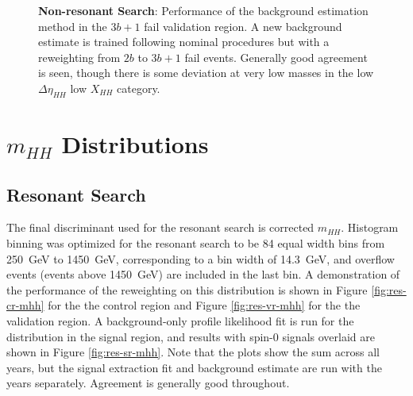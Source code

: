 \begin{figure}[ht]
  \centering
  \hspace*{-2cm}
  \caption{\label{fig:nonres-sr-mhh-3b1f} \textbf{Non-resonant Search}: Performance of the background estimation 
  method in the $3b+1$ fail validation region. A new background estimate is trained following nominal procedures 
  but with a reweighting from $2b$ to $3b+1$ fail events. Generally good agreement is seen, though there is some 
  deviation at very low masses in the low $\Delta\eta_{HH}$ low $X_{HH}$ category.}
\end{figure}


\FloatBarrier
\clearpage
\section{$m_{HH}$ Distributions}
\subsection{Resonant Search}
The final discriminant used for the resonant search is corrected $m_{HH}$. Histogram binning was 
optimized for the resonant search to be 84 equal width bins from \SI{250}{\GeV} to \SI{1450}{\GeV}, 
corresponding to a bin width of \SI{14.3}{\GeV}, and overflow events (events above \SI{1450}{\GeV}) 
are included in the last bin. A demonstration of the performance of the reweighting on this 
distribution is shown in Figure \ref{fig:res-cr-mhh} for the the control region and Figure \ref{fig:res-vr-mhh} for 
the the validation region. A background-only profile likelihood fit is run for the distribution in the signal 
region, and results with spin-0 signals overlaid are shown in Figure \ref{fig:res-sr-mhh}. Note that 
the plots show the sum across all years, but the signal extraction fit and background estimate are run with the 
years separately. Agreement is generally good throughout.

